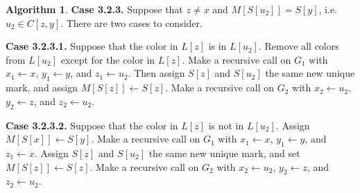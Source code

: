 \documentclass[12pt,letterpaper]{article}
\theoremstyle{plain}
\theoremstyle{definition}
\theoremstyle{break}
\newtheorem{algorithm}[lemma]{Algorithm}     %
\begin{document}
\begin{algorithm}
\textbf{Case 3.2.3.} Suppose that $z\ne x$ and $M[S[u_2]]=S[y]$, i.e.
$u_2\in C[z,y]$. There are
two cases to consider.

\textbf{Case 3.2.3.1.} Suppose that the color in $L[z]$ is in $L[u_2]$. Remove
all colors from $L[u_2]$ except for the color in $L[z]$.
Make a recursive call on $G_1$ with $x_1\leftarrow x$,
$y_1\leftarrow y$, and $z_1\leftarrow u_2$.
Then assign $S[z]$ and $S[u_2]$ the same new unique mark, and assign
$M[S[z]]\leftarrow S[z]$. Make a
recursive call on $G_2$ with $x_2\leftarrow u_2$, $y_2\leftarrow z$,
and $z_2\leftarrow u_2$.

\textbf{Case 3.2.3.2.} Suppose that the color in $L[z]$ is not in $L[u_2]$.
Assign $M[S[x]]\leftarrow S[y]$. Make a recursive call on $G_1$
with $x_1\leftarrow x$,
$y_1\leftarrow y$, and $z_1\leftarrow x$.
Assign $S[z]$ and $S[u_2]$ the same new unique mark, and
set $M[S[z]]\leftarrow S[z]$. Make a
recursive call on $G_2$ with $x_2\leftarrow u_2$, $y_2\leftarrow z$,
and $z_2\leftarrow u_2$.
\end{algorithm}
\end{document}
